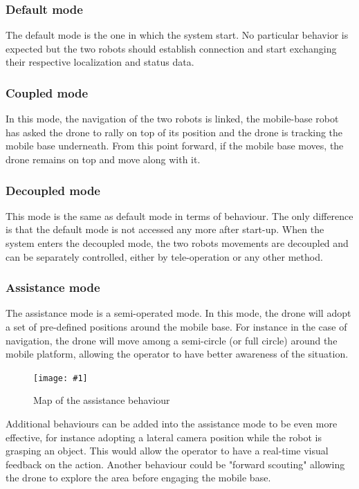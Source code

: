 \documentclass[11pt,a4paper]{article}
\newcommand{\centerFigure}[2]{
\begin{figure}[h]	
\centering
\texttt{[image: \#1]}
\caption{#2}
\end{figure}
}
\begin{document}

\subsubsection{Default mode}
The default mode is the one in which the system start. No particular behavior is expected but the two
robots should establish connection and start exchanging their respective localization and status data.

\subsubsection{Coupled mode}
In this mode, the navigation of the two robots is linked, the mobile-base robot has asked the drone to 
rally on top of its position and the drone is tracking the mobile base underneath. From this point forward, if the mobile base moves, the drone remains on top and move along with it.

\subsubsection{Decoupled mode}
This mode is the same as default mode in terms of behaviour. The only difference is that the default mode
is not accessed any more after start-up. When the system enters the decoupled mode, the two robots movements
are decoupled and can be separately controlled, either by tele-operation or any other method.

\subsubsection{Assistance mode}
The assistance mode is a semi-operated mode. In this mode, the drone will adopt a set of pre-defined
positions around the mobile base. For instance in the case of navigation, the drone will move 
among a semi-circle (or full circle) around the mobile platform, allowing the 
operator to have better awareness of the situation.

\centerFigure{assistanceBehavior.png}{Map of the assistance behaviour}

Additional behaviours can be added into the assistance mode to be even more effective, for
instance adopting a lateral camera position while the robot is grasping an object. This would
allow the operator to have a real-time visual feedback on the action. Another behaviour
could be "forward scouting" allowing the drone to explore the area before engaging the 
mobile base.
\end{document}
